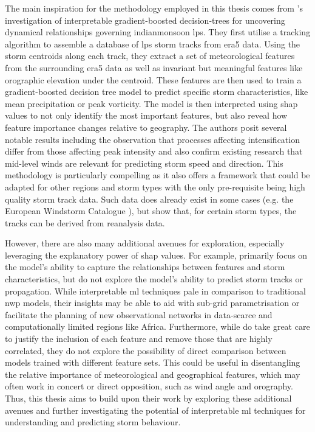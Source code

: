 The main inspiration for the methodology employed in this thesis comes from \cite{Hunt2024}'s investigation of interpretable gradient-boosted decision-trees for uncovering dynamical relationships governing \gls{indianmonsoon} \acrfull{lps}. They first utilise a tracking algorithm to assemble a database of \acrshort{lps} storm tracks from \acrshort{era5} data. Using the storm centroids along each track, they extract a set of meteorological features from the surrounding \acrshort{era5} data as well as invariant but meaningful features like orographic elevation under the centroid. These features are then used to train a gradient-boosted decision tree model to predict specific storm characteristics, like mean precipitation or peak vorticity. The model is then interpreted using \acrshort{shap} values to not only identify the most important features, but also reveal how feature importance changes relative to geography. The authors posit several notable results including the observation that processes affecting intensification differ from those affecting peak intensity and also confirm existing research that mid-level winds are relevant for predicting storm speed and direction. This methodology is particularly compelling as it also offers a framework that could be adapted for other regions and storm types with the only pre-requisite being high quality storm track data. Such data does already exist in some cases (e.g. the European Windstorm Catalogue \citep{Roberts2014}), but \cite{Hunt2024} show that, for certain storm types, the tracks can be derived from reanalysis data.

However, there are also many additional avenues for exploration, especially leveraging the explanatory power of \acrshort{shap} values. For example, \cite{Hunt2024} primarily focus on the model's ability to capture the relationships between features and storm characteristics, but do not explore the model's ability to predict storm tracks or propagation. While interpretable \acrshort{ml} techniques pale in comparison to traditional \acrfull{nwp} models, their insights may be able to aid with sub-grid parametrisation or facilitate the planning of new observational networks in data-scarce and computationally limited regions like Africa. Furthermore, while \cite{Hunt2024} do take great care to justify the inclusion of each feature and remove those that are highly correlated, they do not explore the possibility of direct comparison between models trained with different feature sets. This could be useful in disentangling the relative importance of meteorological and geographical features, which may often work in concert or direct opposition, such as wind angle and orography. Thus, this thesis aims to build upon their work by exploring these additional avenues and further investigating the potential of interpretable \acrshort{ml} techniques for understanding and predicting storm behaviour.